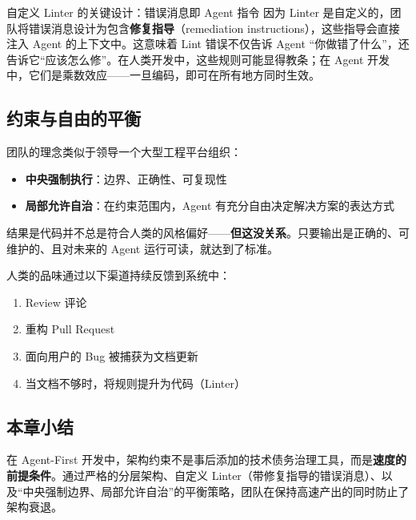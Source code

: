 \begin{warningbox}{自定义 Linter 的关键设计：错误消息即 Agent 指令}
因为 Linter 是自定义的，团队将错误消息设计为包含\textbf{修复指导}（remediation instructions），这些指导会直接注入 Agent 的上下文中。这意味着 Lint 错误不仅告诉 Agent ``你做错了什么''，还告诉它``应该怎么修''。在人类开发中，这些规则可能显得教条；在 Agent 开发中，它们是乘数效应——一旦编码，即可在所有地方同时生效。
\end{warningbox}

\subsection{约束与自由的平衡}

团队的理念类似于领导一个大型工程平台组织：

\begin{itemize}[nosep]
  \item \textbf{中央强制执行}：边界、正确性、可复现性
  \item \textbf{局部允许自治}：在约束范围内，Agent 有充分自由决定解决方案的表达方式
\end{itemize}

结果是代码并不总是符合人类的风格偏好——\textbf{但这没关系}。只要输出是正确的、可维护的、且对未来的 Agent 运行可读，就达到了标准。

人类的品味通过以下渠道持续反馈到系统中：

\begin{enumerate}[nosep]
  \item Review 评论
  \item 重构 Pull Request
  \item 面向用户的 Bug 被捕获为文档更新
  \item 当文档不够时，将规则提升为代码（Linter）
\end{enumerate}

\subsection{本章小结}

在 Agent-First 开发中，架构约束不是事后添加的技术债务治理工具，而是\textbf{速度的前提条件}。通过严格的分层架构、自定义 Linter（带修复指导的错误消息）、以及``中央强制边界、局部允许自治''的平衡策略，团队在保持高速产出的同时防止了架构衰退。

\newpage

